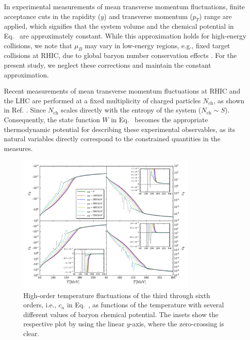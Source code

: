 \documentclass[aps,twocolumn,
prl,
superscriptaddress,nofootinbib,floatfix]{revtex4-2}
\begin{document}
In experimental measurements of mean transverse momentum fluctuations, finite acceptance cuts in the rapidity ($y$) and transverse momentum ($p_{T}$) range are applied, which signifies that the system volume and the chemical potential in Eq.~ are approximately constant. While this approximation holds for high-energy collisions, we note that $\mu_B$ may vary in low-energy regions, e.g., fixed target collisions at RHIC, due to global baryon number conservation effects \cite{Braun-Munzinger:2020jbk, Vovchenko:2021kxx, Fu:2023lcm}. For the present study, we neglect these corrections and maintain the constant approximation. 

Recent measurements of mean transverse momentum fluctuations at RHIC and the LHC are performed at a fixed multiplicity of charged particles $N_{\mathrm{ch}}$, as shown in Ref. \cite{ALICE:2023tej,ATLAS:2024jvf,QM2025rutik,QM2025gao}. Since $N_{\mathrm{ch}}$ scales directly with the entropy of the system ($N_{\mathrm{ch}}\sim S$). Consequently, the state function $W$ in Eq.~ becomes the appropriate thermodynamic potential for describing these experimental observables, as its natural variables directly correspond to the constrained quantities in the measures.

%
\begin{figure}[t]
\includegraphics[width=0.8\textwidth]{c3toc6}
\caption{High-order temperature fluctuations of the third through sixth orders, i.e., $c_n$ in Eq.~, as functions of the temperature with several different values of baryon chemical potential. The insets show the respective plot by using the linear $y$-axis, where the zero-crossing is clear.}
\label{fig:c3-c6}
\end{figure}
%
\end{document}
